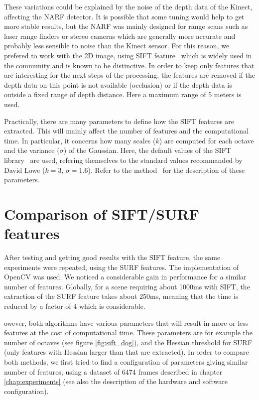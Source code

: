 These variations could be explained by the noise of the depth data of the Kinect, affecting the \gls{NARF} detector. It is possible that some tuning would help to get more stable results, but the \gls{NARF} was mainly designed for range scans such as laser range finders or stereo cameras which are generally more accurate and probably less sensible to noise than the Kinect sensor. For this reason, we prefered to work with the 2D image, using \gls{SIFT} feature~\cite{lowe_2004_sift} which is widely used in the community and is known to be distinctive. In order to keep only features that are interesting for the next steps of the processing, the features are removed if the depth data on this point is not available (occlusion) or if the depth data is outside a fixed range of depth distance. Here a maximum range of 5 meters is used.

Practically, there are many parameters to define how the \gls{SIFT} features are extracted. This will mainly affect the number of features and the computational time. In particular, it concerns how many scales ($k$) are computed for each octave and the variance ($\sigma$) of the Gaussian. Here, the default values of the \gls{SIFT} library~\cite{hess_sift} are used, refering themselves to the standard values recommanded by David Lowe ($k=3$, $\sigma=1.6$). Refer to the method~\cite{lowe_2004_sift} for the description of these parameters.

\clearpage
\section{Comparison of SIFT/SURF features}
After testing and getting good results with the \gls{SIFT} feature, the same experiments were repeated, using the \gls{SURF} features. The implementation of OpenCV was used. We noticed a considerable gain in performance for a similar number of features. Globally, for a scene requiring about 1000ms with \gls{SIFT}, the extraction of the \gls{SURF} feature takes about 250ms, meaning that the time is reduced by a factor of 4 which is considerable.

owever, both algorithms have various parameters that will result in more or less features at the cost of computational time. These parameters are for example the number of octaves (see figure \ref{fig:sift_dog}), and the Hessian threshold for SURF (only features with Hessian larger than that are extracted). In order to compare both methods, we first tried to find a configuration of parameters giving similar number of features, using a dataset of 6474 frames described in chapter \ref{chap:experiments} (see also the description of the hardware and software configuration).

